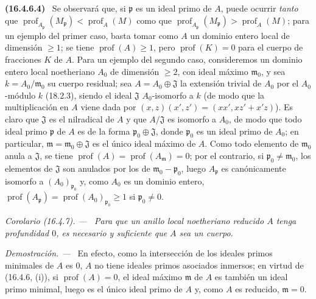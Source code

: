 \documentclass[10pt,oneside]{book}
\makeatletter
\newcommand{\setmanualcurrentlabel}[1]{\def\@currentlabel{#1}}
\newcommand{\oldpage}[2][]{%
  \setcounter{footnote}{0}%
  \marginpar{\scriptsize\textbf{#1}~|~#2}\ignorespaces}
\newenvironment{env}[1][]{\setmanualcurrentlabel{#1}\par\medskip\noindent\textbf{(#1)}\ }{\par}
\newenvironment{corollary}[1][]{%
  \setmanualcurrentlabel{#1}\par\medskip\noindent\itshape Corolario (#1). ---\ }{\par}
\newenvironment{proof}{%
  \par\medskip\noindent\textit{Demostración. ---\ }}{\par}
\providecommand{\setmin}{-}%
\makeatother
\begin{document}
\begin{env}[16.4.6.4]
\label{0.16.4.6.4-es}
Se observará que, si $\mathfrak{p}$ es un ideal primo de $A$, puede ocurrir
\emph{tanto} que
$\operatorname{prof}_{A_{\mathfrak{p}}}(M_{\mathfrak{p}})
<\operatorname{prof}_A(M)$ como que
$\operatorname{prof}_{A_{\mathfrak{p}}}(M_{\mathfrak{p}})
>\operatorname{prof}_A(M)$; para un ejemplo del primer caso,
\oldpage[0\textsubscript{IV-1}]{35}
basta tomar como $A$ un dominio entero local de dimensión $\geq1$; se tiene
$\operatorname{prof}(A)\geq1$, pero $\operatorname{prof}(K)=0$ para el cuerpo
de fracciones $K$ de $A$. Para un ejemplo del segundo caso, consideremos un
dominio entero local noetheriano $A_0$ de dimensión $\geq2$, con ideal máximo
$\mathfrak{m}_0$, y sea $k=A_0/\mathfrak{m}_0$ su cuerpo residual; sea
$A=A_0\oplus\mathfrak{J}$ la extensión trivial de $A_0$ por el $A_0$-módulo
$k$ (18.2.3), siendo el ideal $\mathfrak{J}$ $A_0$-isomorfo a $k$ (de modo que
la multiplicación en $A$ viene dada por
$(x,z)(x',z')=(xx',xz'+x'z)$). Es claro que $\mathfrak{J}$ es el nilradical de
$A$ y que $A/\mathfrak{J}$ es isomorfo a $A_0$, de modo que todo ideal primo
$\mathfrak{p}$ de $A$ es de la forma
$\mathfrak{p}_0\oplus\mathfrak{J}$, donde $\mathfrak{p}_0$ es un ideal primo
de $A_0$; en particular, $\mathfrak{m}=\mathfrak{m}_0\oplus\mathfrak{J}$ es el
único ideal máximo de $A$. Como todo elemento de $\mathfrak{m}_0$ anula a
$\mathfrak{J}$, se tiene
$\operatorname{prof}(A)=\operatorname{prof}(A_{\mathfrak{m}})=0$; por el
contrario, si $\mathfrak{p}_0\neq\mathfrak{m}_0$, los elementos de
$\mathfrak{J}$ son anulados por los de
$\mathfrak m_0\setmin\mathfrak{p}_0$, luego $A_{\mathfrak{p}}$ es canónicamente
isomorfo a $(A_0)_{\mathfrak{p}_0}$ y, como $A_0$ es un dominio entero,
$\operatorname{prof}(A_{\mathfrak{p}})
=\operatorname{prof}(A_0)_{\mathfrak p_0}\geq1$ si
$\mathfrak{p}_0\neq0$.
\end{env}

\begin{corollary}[16.4.7]
\label{0.16.4.7-es}
Para que un anillo local noetheriano reducido $A$ tenga profundidad $0$, es
necesario y suficiente que $A$ sea un cuerpo.
\end{corollary}

\begin{proof}
En efecto, como la intersección de los ideales primos minimales de $A$ es $0$,
$A$ no tiene ideales primos asociados inmersos; en virtud de (16.4.6, (i)), si
$\operatorname{prof}(A)=0$, el ideal máximo $\mathfrak{m}$ de $A$ es también
un ideal primo minimal, luego es el único ideal primo de $A$ y, como $A$ es
reducido, $\mathfrak{m}=0$.
\end{proof}
\end{document}
